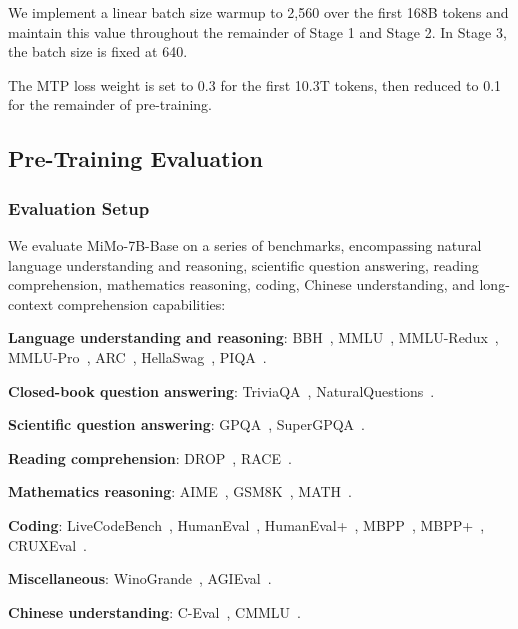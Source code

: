 \documentclass[11pt, a4paper, logo, copyright, nonumbering]{xiaomi}
\newcommand{\mimobase}{MiMo-7B-Base}
\begin{document}
We implement a linear batch size warmup to 2,560 over the first 168B tokens and maintain this value throughout the remainder of Stage 1 and Stage 2.
In Stage 3, the batch size is fixed at 640.

The MTP loss weight is set to 0.3 for the first 10.3T tokens, then reduced to 0.1 for the remainder of pre-training.



\subsection{Pre-Training Evaluation}


\subsubsection{Evaluation Setup}


We evaluate \mimobase{} on a series of benchmarks, encompassing natural language understanding and reasoning, scientific question answering, reading comprehension, mathematics reasoning, coding, Chinese understanding, and long-context comprehension capabilities:

\textbf{Language understanding and reasoning}: BBH~\citep{suzgun2022challenging}, MMLU~\cite{hendrycks2020measuring}, MMLU-Redux~\citep{gema2024we}, MMLU-Pro~\citep{wang2024mmlu}, ARC~\citep{clark2018think}, HellaSwag~\citep{zellers2019hellaswag}, PIQA~\citep{bisk2020piqa}.

\textbf{Closed-book question answering}: TriviaQA~\citep{joshi2017triviaqa}, NaturalQuestions~\citep{kwiatkowski2019natural}.

\textbf{Scientific question answering}: GPQA~\citep{rein2024gpqa}, SuperGPQA~\citep{du2025supergpqa}.

\textbf{Reading comprehension}: DROP~\citep{dua2019drop}, RACE~\citep{lai2017race}.

\textbf{Mathematics reasoning}: AIME~\citep{AIME}, GSM8K~\citep{cobbe2021training}, MATH~\citep{hendrycks2021measuring}.

       
\textbf{Coding}: LiveCodeBench~\citep{jain2024livecodebench}, HumanEval~\citep{chen2021evaluating}, HumanEval+~\citep{liu2023your}, MBPP~\citep{austin2021program}, MBPP+~\citep{liu2023your}, CRUXEval~\citep{gu2024cruxeval}.

\textbf{Miscellaneous}: WinoGrande~\citep{sakaguchi2021winogrande}, AGIEval~\citep{zhong2023agieval}.

\textbf{Chinese understanding}: C-Eval~\citep{huang2023c}, CMMLU~\citep{li2023cmmlu}.
\end{document}

